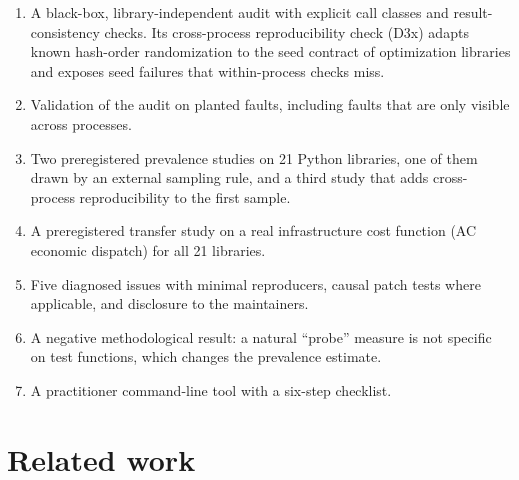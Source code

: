\documentclass[acmsmall,screen,review,anonymous=false]{acmart}
\providecommand{\tightlist}{\setlength{\itemsep}{0pt}\setlength{\parskip}{0pt}}
\begin{document}
\begin{enumerate}
\def\labelenumi{\arabic{enumi}.}
\tightlist
\item
  A black-box, library-independent audit with explicit call classes and result-consistency checks. Its
  cross-process reproducibility check (D3x) adapts known hash-order randomization to the seed contract of
  optimization libraries and exposes seed failures that within-process checks miss.
\item
  Validation of the audit on planted faults, including faults that are only visible across processes.
\item
  Two preregistered prevalence studies on 21 Python libraries, one of them drawn by an external sampling rule,
  and a third study that adds cross-process reproducibility to the first sample.
\item
  A preregistered transfer study on a real infrastructure cost function (AC economic dispatch) for all 21 libraries.
\item
  Five diagnosed issues with minimal reproducers, causal patch tests where applicable, and disclosure to the
  maintainers.
\item
  A negative methodological result: a natural ``probe'' measure is not specific on test functions, which changes
  the prevalence estimate.
\item
  A practitioner command-line tool with a six-step checklist.
\end{enumerate}

\section{Related work}\label{related-work}
\end{document}
